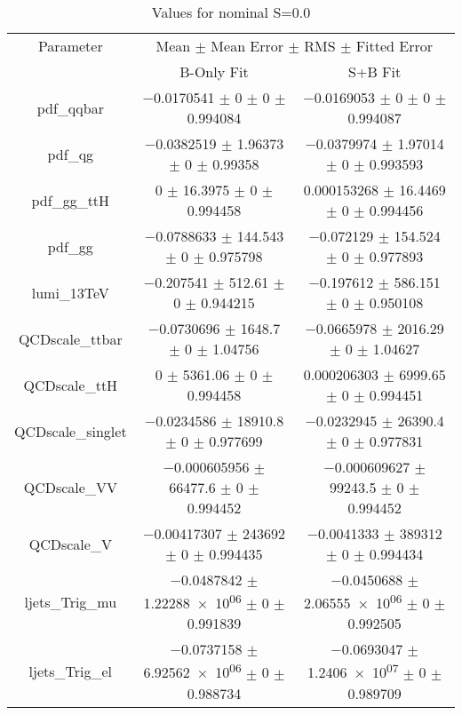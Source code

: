 \begin{table}
\centering
\caption{Values for nominal S=0.0}
\begin{tabular}{ccc}
\toprule
Parameter & \multicolumn{2}{c}{Mean $\pm$ Mean Error $\pm$ RMS $\pm$ Fitted Error}\\
 & B-Only Fit & S+B Fit\\
\midrule
pdf\_qqbar & \num{-0.0170541} $\pm$ \num{0} $\pm$ \num{0} $\pm$ \num{0.994084} & \num{-0.0169053} $\pm$ \num{0} $\pm$ \num{0} $\pm$ \num{0.994087}\\
pdf\_qg & \num{-0.0382519} $\pm$ \num{1.96373} $\pm$ \num{0} $\pm$ \num{0.99358} & \num{-0.0379974} $\pm$ \num{1.97014} $\pm$ \num{0} $\pm$ \num{0.993593}\\
pdf\_gg\_ttH & \num{0} $\pm$ \num{16.3975} $\pm$ \num{0} $\pm$ \num{0.994458} & \num{0.000153268} $\pm$ \num{16.4469} $\pm$ \num{0} $\pm$ \num{0.994456}\\
pdf\_gg & \num{-0.0788633} $\pm$ \num{144.543} $\pm$ \num{0} $\pm$ \num{0.975798} & \num{-0.072129} $\pm$ \num{154.524} $\pm$ \num{0} $\pm$ \num{0.977893}\\
lumi\_13TeV & \num{-0.207541} $\pm$ \num{512.61} $\pm$ \num{0} $\pm$ \num{0.944215} & \num{-0.197612} $\pm$ \num{586.151} $\pm$ \num{0} $\pm$ \num{0.950108}\\
QCDscale\_ttbar & \num{-0.0730696} $\pm$ \num{1648.7} $\pm$ \num{0} $\pm$ \num{1.04756} & \num{-0.0665978} $\pm$ \num{2016.29} $\pm$ \num{0} $\pm$ \num{1.04627}\\
QCDscale\_ttH & \num{0} $\pm$ \num{5361.06} $\pm$ \num{0} $\pm$ \num{0.994458} & \num{0.000206303} $\pm$ \num{6999.65} $\pm$ \num{0} $\pm$ \num{0.994451}\\
QCDscale\_singlet & \num{-0.0234586} $\pm$ \num{18910.8} $\pm$ \num{0} $\pm$ \num{0.977699} & \num{-0.0232945} $\pm$ \num{26390.4} $\pm$ \num{0} $\pm$ \num{0.977831}\\
QCDscale\_VV & \num{-0.000605956} $\pm$ \num{66477.6} $\pm$ \num{0} $\pm$ \num{0.994452} & \num{-0.000609627} $\pm$ \num{99243.5} $\pm$ \num{0} $\pm$ \num{0.994452}\\
QCDscale\_V & \num{-0.00417307} $\pm$ \num{243692} $\pm$ \num{0} $\pm$ \num{0.994435} & \num{-0.0041333} $\pm$ \num{389312} $\pm$ \num{0} $\pm$ \num{0.994434}\\
ljets\_Trig\_mu & \num{-0.0487842} $\pm$ \num{1.22288e+06} $\pm$ \num{0} $\pm$ \num{0.991839} & \num{-0.0450688} $\pm$ \num{2.06555e+06} $\pm$ \num{0} $\pm$ \num{0.992505}\\
ljets\_Trig\_el & \num{-0.0737158} $\pm$ \num{6.92562e+06} $\pm$ \num{0} $\pm$ \num{0.988734} & \num{-0.0693047} $\pm$ \num{1.2406e+07} $\pm$ \num{0} $\pm$ \num{0.989709}\\

\end{tabular}
\end{table}
